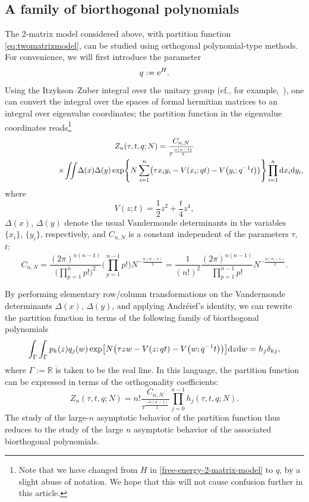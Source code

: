 \documentclass[10pt,a4paper]{amsart}
\numberwithin{equation}{section}
\begin{document}
\subsection{A family of biorthogonal polynomials}
The 2-matrix model considered above, with partition function \eqref{eq:twomatrixmodel}, can be studied using orthogonal polynomial-type methods. For convenience, we will first introduce the parameter
 \begin{equation} \label{eq:qeH}
 q := {\rm e}^H.
 \end{equation}
Using the Itzykson--Zuber integral over the unitary group (cf., for example,~\cite{IZ,Mehta,ZJZ}), one can convert the integral over the spaces of formal hermitian
matrices to an integral over eigenvalue coordinates; the partition function in the eigenvalue coordinates reads\footnote{Note that we have changed from $H$ in \eqref{free-energy-2-matrix-model} to $q$, by a slight abuse of notation. We hope that this will not cause confusion further in this article.}
 \begin{gather*} %
 Z_{n}(\tau,t,q;N) = \frac{C_{n,N}}{\tau^{\frac{n(n-1)}{2}}} \\
 \hphantom{Z_{n}(\tau,t,q;N) =}{}\times\!
 \iint\! \Delta(x) \Delta(y) \exp\Biggl\{ N\sum_{i=1}^n \bigl(\tau x_iy_i - V(x_i;q t) - V\bigl(y_i;q^{-1}t\bigr) \bigr)\Biggr\}\prod_{i=1}^n {\rm d}x_i {\rm d}y_i,
 \end{gather*}
where
\begin{equation*}
 V(z;t) = \frac{1}{2}z^2 + \frac{t}{4} z^4,
\end{equation*}
$\Delta(x)$, $\Delta(y)$ denote the usual Vandermonde determinants in the variables $\{x_i\}$, $\{y_i\}$, respectively, and $C_{n,N}$ is a constant independent of the parameters $\tau$,~$t$:
 \begin{equation*}
 C_{n,N} = \frac{(2\pi)^{n(n-1)}}{\bigl(\prod_{p=1}^n p!\bigr)^2} \Biggl(\prod_{p=1}^{n-1} p!\Biggr) N^{-\frac{n(n-1)}{2}}
 = \frac{1}{(n!)^2}\frac{(2\pi)^{n(n-1)}}{\prod_{p=1}^{n-1} p!}N^{-\frac{n(n-1)}{2}}.
 \end{equation*}

By performing elementary row/column transformations on the Vandermonde determinants $\Delta(x)$, $\Delta(y)$, and applying Andr\'eief's identity, we can rewrite the partition function in terms of the following family of biorthogonal polynomials~\cite{Mehta}
 \begin{equation} \label{biorthogonal-polynomials}
 \int_\Gamma \int_{\Gamma} p_k(z)q_j(w)\exp \bigl[ N\bigl(\tau z w - V(z;q t) - V\bigl(w;q^{-1}t\bigr) \bigr)\bigr] {\rm d}z {\rm d}w = h_j \delta_{kj},
 \end{equation}
where $\Gamma := \mathbb{R}$ is taken to be the real line.
In this language, the partition function can be expressed in terms of the orthogonality coefficients:
 \begin{equation}\label{partition-function-orthogonality-coeff}
 Z_{n}(\tau,t,q;N) = n!\frac{C_{n,N}}{\tau^{\frac{-n(n-1)}{2}}}\prod_{j=0}^{n-1} h_j(\tau,t,q;N).
 \end{equation}
 The study of the large-$n$ asymptotic behavior of the partition function thus reduces to the study of the large $n$ asymptotic behavior of the associated biorthogonal polynomials.
\end{document}
